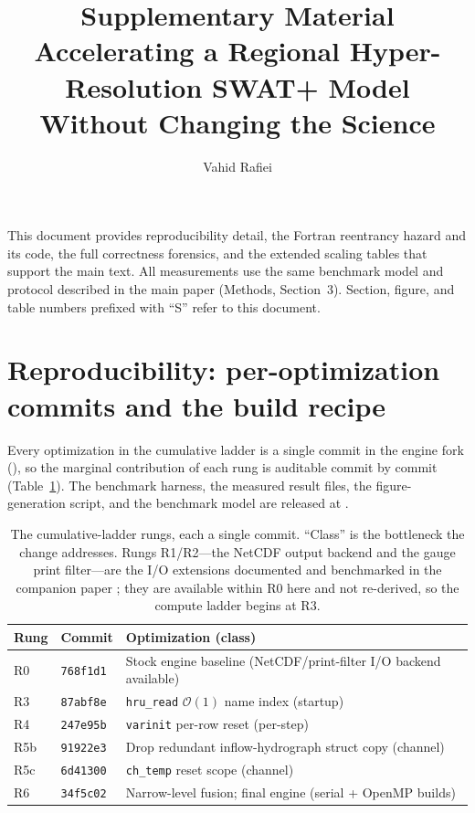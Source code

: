\documentclass[12pt]{article}
\title{Supplementary Material\\[2pt]
\large Accelerating a Regional Hyper-Resolution {SWAT+} Model Without Changing the Science}
\author{Vahid Rafiei}
\date{}
\begin{document}
\maketitle

This document provides reproducibility detail, the Fortran reentrancy hazard and its code,
the full correctness forensics, and the extended scaling tables that support the main text.
All measurements use the same benchmark model and protocol described in the main paper (Methods, Section~3). Section, figure, and table numbers prefixed with ``S'' refer to this document.

\section{Reproducibility: per-optimization commits and the build recipe}\label{si:repro}
Every optimization in the cumulative ladder is a single commit in the engine fork
(), so the marginal contribution of each rung is
auditable commit by commit (Table~\ref{tab:commits}). The benchmark harness, the measured
result files, the figure-generation script, and the benchmark model are released at
.

\begin{table}[h]
\centering
\caption{The cumulative-ladder rungs, each a single commit. ``Class'' is the bottleneck the
change addresses. Rungs R1/R2---the NetCDF output backend and the gauge print filter---are the I/O
extensions documented and benchmarked in the companion paper \citep{Rafiei2026SWATGenX}; they are
available within R0 here and not re-derived, so the compute ladder begins at R3.}
\label{tab:commits}
\begin{tabular}{lll}
\toprule
Rung & Commit & Optimization (class) \\
\midrule
R0  & \texttt{768f1d1} & Stock engine baseline (NetCDF/print-filter I/O backend available) \\
R3  & \texttt{87abf8e} & \texttt{hru\_read} $\mathcal{O}(1)$ name index (startup) \\
R4  & \texttt{247e95b} & \texttt{varinit} per-row reset (per-step) \\
R5b & \texttt{91922e3} & Drop redundant inflow-hydrograph struct copy (channel) \\
R5c & \texttt{6d41300} & \texttt{ch\_temp} reset scope (channel) \\
R6  & \texttt{34f5c02} & Narrow-level fusion; final engine (serial + OpenMP builds) \\
\bottomrule
\end{tabular}
\end{table}
\end{document}
